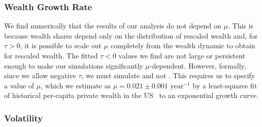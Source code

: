 
\subsubsection{Wealth Growth Rate}
We find numerically that the results of our analysis do not depend on $\mu$. This is because wealth shares depend only on the distribution of rescaled wealth and, for $\tau>0$, it is possible to scale out $\mu$ completely from the wealth dynamic to obtain  for rescaled wealth. The fitted $\tau<0$ values we find are not large or persistent enough to make our simulations significantly $\mu$-dependent. However, formally, since we allow negative $\tau$, we must simulate  and not . This requires us to specify a value of $\mu$, which we estimate as $\mu=0.021\pm 0.001 \text{ year}^{-1}$ by a least-squares fit of historical per-capita private wealth in the US~\cite{PikettyZucman2014} to an exponential growth curve.

%

\subsubsection{Volatility}

